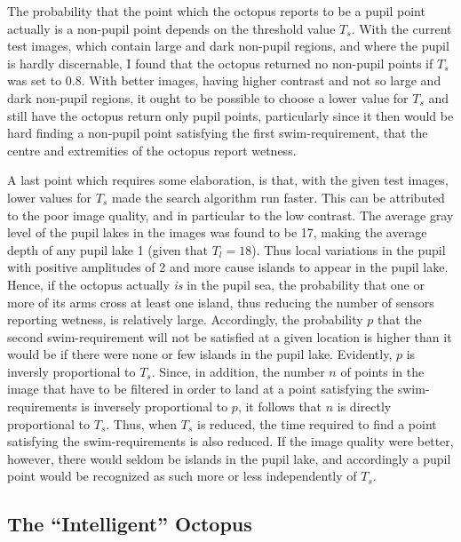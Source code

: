 
The probability that the point which the octopus reports to be a pupil
point actually is a non-pupil point depends on the threshold value
$T_{s}$.  With the current test images, which contain large and dark
non-pupil regions, and where the pupil is hardly discernable, I found
that the octopus returned no non-pupil points if $T_{s}$ was set to
0.8.  With better images, having higher contrast and not so large and
dark non-pupil regions, it ought to be possible to choose a lower
value for $T_{s}$ and still have the octopus return only pupil points,
particularly since it then would be hard finding a non-pupil point
satisfying the first swim-requirement, that the centre and extremities
of the octopus report wetness.

A last point which requires some elaboration, is that, with the given
test images, lower values for $T_{s}$ made the search algorithm run
faster.  This can be attributed to the poor image quality, and in
particular to the low contrast.  The average gray level of the pupil
lakes in the images was found to be 17, making the average depth of
any pupil lake 1 (given that $T_{l}=18$).  Thus local variations in
the pupil with positive amplitudes of 2 and more cause islands to
appear in the pupil lake.  Hence, if the octopus actually {\em is\/}
in the pupil sea, the probability that one or more of its arms cross
at least one island, thus reducing the number of sensors reporting
wetness, is relatively large.  Accordingly, the probability $p$ that
the second swim-requirement will not be satisfied at a given location
is higher than it would be if there were none or few islands in the
pupil lake.  Evidently, $p$ is inversly proportional to $T_{s}$.
Since, in addition, the number $n$ of points in the image that have to
be filtered in order to land at a point satisfying the
swim-requirements is inversely proportional to $p$, it follows that
$n$ is directly proportional to $T_{s}$.  Thus, when $T_{s}$ is
reduced, the time required to find a point satisfying the
swim-requirements is also reduced.  If the image quality were better,
however, there would seldom be islands in the pupil lake, and
accordingly a pupil point would be recognized as such more or less
independently of $T_{s}$.

\subsection{The ``Intelligent'' Octopus}
\label{algo:seek:IQ}

